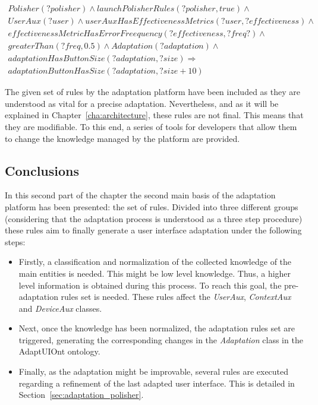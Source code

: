\footnotesize
\begin{equation} \label{ec:post_adaptation_rule}
  \begin{align*} 
  Polisher(?polisher) ∧ launchPolisherRules(?polisher, true) ∧\\
  UserAux(?user) ∧ userAuxHasEffectivenessMetrics(?user, ?effectiveness) ∧ \\
  effectivenessMetricHasErrorFreequency(?effectiveness, ?freq?) ∧\\
  greaterThan(?freq, 0.5) ∧ Adaptation(?adaptation) ∧\\
  adaptationHasButtonSize(?adaptation, ?size)
  \Rightarrow \\
  adaptationButtonHasSize(?adaptation, ?size + 10)
  \end{align*}
\end{equation}
\normalsize



The given set of rules by the adaptation platform have been included as they are
understood as vital for a precise adaptation. Nevertheless, and as it will be
explained in Chapter~\ref{cha:architecture}, these rules are not final. This
means that they are modifiable. To this end, a series of tools for developers
that allow them to change the knowledge managed by the platform are provided.


\subsection{Conclusions}
\label{sec:rules_conclusions}

In this second part of the chapter the second main basis of the adaptation platform
has been presented: the set of rules. Divided into three different groups
(considering that the adaptation process is understood as a three step procedure)
these rules aim to finally generate a user interface adaptation under the following
steps:

\begin{itemize}
  \item Firstly, a classification and normalization of the collected knowledge of
  the main entities is needed. This might be low level knowledge. Thus, a higher
  level information is obtained during this process. To reach this goal, the
  pre-adaptation rules set is needed. These rules affect the \textit{UserAux},
  \textit{ContextAux} and \textit{DeviceAux} classes.
  
  \item Next, once the knowledge has been normalized, the adaptation rules set
  are triggered, generating the corresponding changes in the \textit{Adaptation}
  class in the AdaptUIOnt ontology.
  
  \item Finally, as the adaptation might be improvable, several rules are executed
  regarding a refinement of the last adapted user interface. This is detailed
  in Section~\ref{sec:adaptation_polisher}.
\end{itemize}